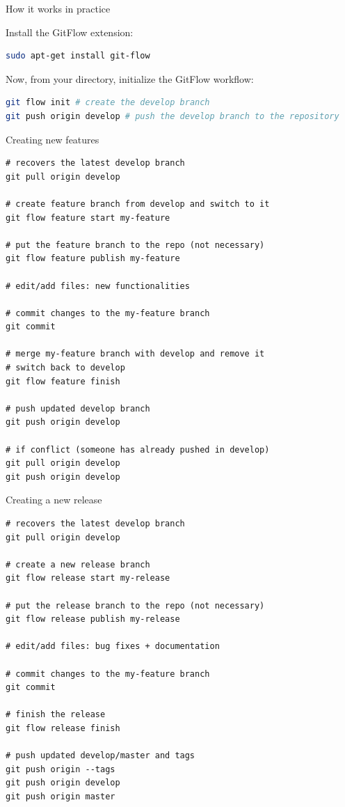 \documentclass{beamer}
\begin{document}
\begin{frame}[fragile]{How it works in practice}

Install the GitFlow extension:

\begin{lstlisting}[language=bash]
sudo apt-get install git-flow
\end{lstlisting}

\vspace{1em}
Now, from your directory, initialize the GitFlow workflow:

\begin{lstlisting}[language=bash]
git flow init # create the develop branch
git push origin develop # push the develop branch to the repository
\end{lstlisting}

\end{frame}

\begin{frame}[fragile]{Creating new features}

\begin{lstlisting}
# recovers the latest develop branch
git pull origin develop

# create feature branch from develop and switch to it
git flow feature start my-feature 

# put the feature branch to the repo (not necessary)
git flow feature publish my-feature 

# edit/add files: new functionalities

# commit changes to the my-feature branch
git commit 

# merge my-feature branch with develop and remove it
# switch back to develop
git flow feature finish

# push updated develop branch
git push origin develop

# if conflict (someone has already pushed in develop)
git pull origin develop
git push origin develop
\end{lstlisting}

\end{frame}

\begin{frame}[fragile]{Creating a new release}

\begin{lstlisting}
# recovers the latest develop branch
git pull origin develop

# create a new release branch
git flow release start my-release

# put the release branch to the repo (not necessary)
git flow release publish my-release 

# edit/add files: bug fixes + documentation

# commit changes to the my-feature branch
git commit 

# finish the release
git flow release finish

# push updated develop/master and tags
git push origin --tags
git push origin develop
git push origin master
\end{lstlisting}
\end{frame}
\end{document}
